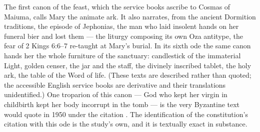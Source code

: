 The first canon of the feast, which the service books ascribe to Cosmas of
Maiuma, calls Mary the animate ark. It also narrates, from the ancient
Dormition traditions, the episode of Jephonias, the man who laid insolent
hands on her funeral bier and lost them --- the liturgy composing its own
Oza antitype, the fear of 2 Kings 6:6--7 re-taught at Mary's burial. In
its sixth ode the same canon hands her the whole furniture of the sanctuary:
candlestick of the immaterial Light, golden censer, the jar and the staff,
the divinely inscribed tablet, the holy ark, the table of the Word of life.
(These texts are described rather than quoted; the accessible English
service books are derivative and their translations unidentified.) One
troparion of this canon --- God who kept her virgin in childbirth kept her
body incorrupt in the tomb --- is the very Byzantine text
 would quote in 1950 under the citation
. The identification of the constitution's citation
with this ode is the study's own, and it is textually exact in
substance.

